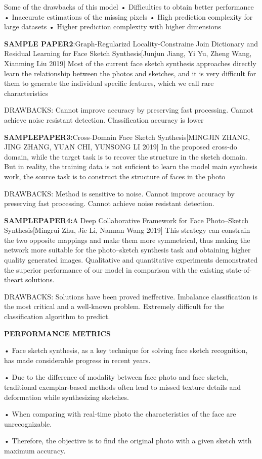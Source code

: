 \documentclass[journal]{IEEEtran} %
\begin{document}
{Some of the drawbacks of this model } 
•	Difficulties to obtain better performance 
•	Inaccurate estimations of the missing pixels 
•	High prediction complexity for large datasets 
•	Higher prediction complexity with higher dimensions 

\textbf{SAMPLE PAPER2}:Graph-Regularizd Locality-Constraine Join  Dictionary and Residual Learning for Face Sketch Synthesis[Junjun Jiang, Yi Yu, Zheng Wang, Xianming Liu
2019]
Most of the current face sketch synthesis approaches directly learn the relationship between the photos and sketches, and it is very difficult for them to generate the individual specific features, which we call rare characteristics

{DRAWBACKS:}
Cannot improve accuracy by preserving fast processing.
Cannot achieve noise resistant detection.
Classification accuracy is lower

\textbf{SAMPLEPAPER3:}Cross-Domain Face Sketch Synthesis[MINGJIN ZHANG, JING ZHANG, YUAN CHI, YUNSONG LI 2019]
In the proposed cross-do domain, while the target task is to recover the structure in the sketch domain. But in reality, the training data is not suficient to learn the model main synthesis work, the source task is to construct the structure of faces in the photo

{DRAWBACKS:}
Method is sensitive to noise.
Cannot improve accuracy by preserving fast processing.
Cannot achieve noise resistant detection.

\textbf{SAMPLEPAPER4:}A Deep Collaborative Framework for Face Photo–Sketch Synthesis[Mingrui Zhu, Jie Li, Nannan Wang 2019]
This strategy can constrain the two opposite mappings and make them more symmetrical, thus making the network more suitable for the photo–sketch synthesis task and obtaining higher quality generated images. Qualitative and quantitative experiments demonstrated the superior performance of our model in comparison with the existing state-of-theart solutions.

{DRAWBACKS:}
Solutions have been proved ineffective.
Imbalance classification is the most critical and a well-known problem.
Extremely difficult for the classification algorithm to predict.

\textbf{PERFORMANCE METRICS}

•	Face sketch synthesis, as a key technique for solving face sketch recognition, has made considerable progress in recent years. 

•	Due to the difference of modality between face photo and face sketch, traditional exemplar-based methods often lead to missed texture details and deformation while synthesizing sketches. 

•	When comparing with real-time photo the characteristics of the face are unrecognizable.

•	Therefore, the objective is to find the original photo with a given sketch with maximum accuracy.
\end{document}
